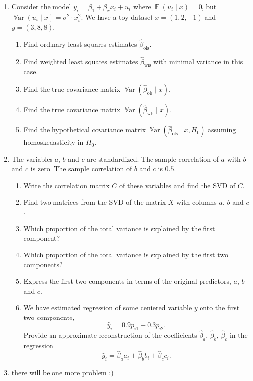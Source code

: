 \documentclass[12pt]{article}
\DeclareMathOperator{\Var}{\mathbb{V}ar}
\DeclareMathOperator{\E}{\mathbb{E}}
\newcommand{\hb}{\hat\beta}
\begin{document}
\begin{enumerate}
    \item Consider the model $y_i = \beta_1 + \beta_x x_i + u_i$ where $\E(u_i \mid x) = 0$, but $\Var(u_i \mid x) = \sigma^2 \cdot x^2_i$.
    We have a toy dataset $x = (1, 2, -1)$ and $y = (3, 8, 8)$.
    
    \begin{enumerate}
        \item Find ordinary least squares estimates $\hb_{\text{ols}}$.
        \item Find weighted least squares estimates $\hb_{\text{wls}}$ with minimal variance in this case. 
        \item Find the true covariance matrix $\Var(\hb_{\text{ols}} \mid x)$.
        \item Find the true covariance matrix $\Var(\hb_{\text{wls}} \mid x)$.
        \item Find the hypothetical covariance matrix $\Var(\hb_{\text{ols}} \mid x, H_0)$ assuming homoskedasticity in $H_0$.
        \end{enumerate}
        

    \item The variables $a$, $b$ and $c$ are standardized. 
    The sample correlation of $a$ with $b$ and $c$ is zero. 
    The sample correlation of $b$ and $c$ is $0.5$.

    \begin{enumerate}
        \item Write the correlation matrix $C$ of these variables and find the SVD of $C$. 
        \item Find two matrices from the SVD of the matrix $X$ with columns $a$, $b$ and $c$.
        \item Which proportion of the total variance is explained by the first component?
        \item Which proportion of the total variance is explained by the first two components?
        \item Express the first two components in terms of the original predictors, $a$, $b$ and $c$. 
        \item We have estimated regression of some centered variable $y$ onto the first two components,
        \[
        \hat y_i = 0.9 p_{i1} - 0.3 p_{i2}.
        \]
        Provide an approximate reconstruction of the coefficients $\hb_a$, $\hb_b$, $\hb_c$ 
        in the regression 
        \[
        \hat y_i = \hb_a a_i + \hb_b b_i + \hb_c c_i. 
        \]
    \end{enumerate}

    \item there will be one more problem :)

\end{enumerate}
\end{document}
